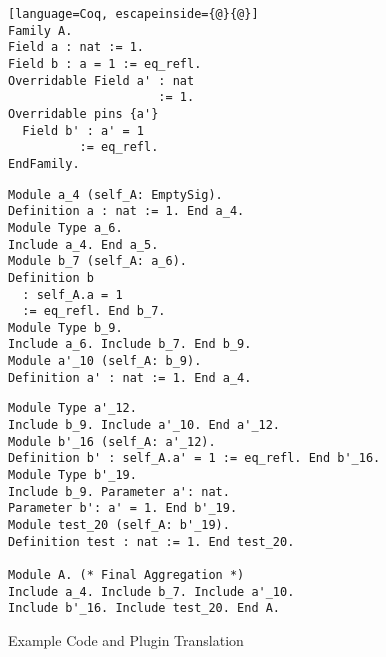 \begin{figure}[!htb]
  \begin{minipage}[t]{0.30\linewidth}
\begin{lstlisting}[language=Coq, escapeinside={@}{@}]
Family A.
Field a : nat := 1.
Field b : a = 1 := eq_refl.
Overridable Field a' : nat 
                     := 1. 
Overridable pins {a'}
  Field b' : a' = 1 
          := eq_refl.
EndFamily.
\end{lstlisting}
  \end{minipage}%
  \begin{minipage}[t]{0.35\linewidth}
\begin{verbatim}
Module a_4 (self_A: EmptySig).
Definition a : nat := 1. End a_4.
Module Type a_6.
Include a_4. End a_5.
Module b_7 (self_A: a_6).
Definition b 
  : self_A.a = 1
  := eq_refl. End b_7.
Module Type b_9.
Include a_6. Include b_7. End b_9.
Module a'_10 (self_A: b_9).
Definition a' : nat := 1. End a_4.
\end{verbatim}
  \end{minipage}
  \begin{minipage}[t]{0.3\linewidth}
\begin{verbatim}
Module Type a'_12.
Include b_9. Include a'_10. End a'_12.
Module b'_16 (self_A: a'_12).
Definition b' : self_A.a' = 1 := eq_refl. End b'_16.
Module Type b'_19.
Include b_9. Parameter a': nat.
Parameter b': a' = 1. End b'_19.
Module test_20 (self_A: b'_19).
Definition test : nat := 1. End test_20.

Module A. (* Final Aggregation *)
Include a_4. Include b_7. Include a'_10.
Include b'_16. Include test_20. End A.
\end{verbatim}
  \end{minipage}
  \caption{Example Code and Plugin Translation}\label{fig:plugin-example1}
\end{figure}


